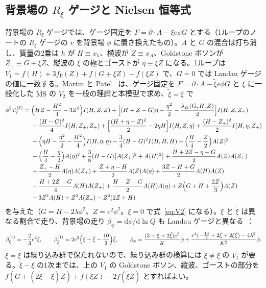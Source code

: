 \documentclass[a4paper,10pt]{ltjsarticle}
\newcommand{\dd}{\mathrm{d}}
\newcommand{\MSbar}{\overline{\mathrm{MS}}}
\begin{document}
\subsection{背景場の $R_\xi$ ゲージと Nielsen 恒等式}\label{sec:rxi}

背景場の $R_\xi$ ゲージでは、ゲージ固定を $F=\partial\!\cdot\!A-\xi e\phi G$ とする（1ループのノートの $R_\xi$ ゲージの $v$ を背景場 $\phi$ に置き換えたもの）。$A$ と $G$ の混合は打ち消し、質量の2乗は $h$ が $H\equiv x_h$、横波が $Z\equiv x_A$、Goldstone ボソンが $Z_+\equiv G+\xi Z$、縦波の $\xi$ の極とゴーストが $\eta\equiv\xi Z$ になる。1ループは $V_1=f(H)+3f_V(Z)+f(G+\xi Z)-f(\xi Z)$ で、$G=0$ では Landau ゲージの値に一致する。Martin と Patel~\cite{mp18} は、ゲージ固定を $F=\partial\!\cdot\!A-\tilde\xi e\phi G$ と $\xi$ に一般化した $\MSbar$ の $V_2$ を一般の理論と本模型で求め、$\tilde\xi=\xi$ で
\begin{equation}
\begin{aligned}
\phi^2V_2^{(\xi)}={}&\Bigl(HZ-\frac{H^2}4-3Z^2\Bigr)I(H,Z,Z)+\Bigl[(H+Z-G)\eta-\frac{\eta^2}2-\frac{\lambda_K(G,H,Z)}2\Bigr]I(H,Z,Z_+)\\
&-\frac{(H-G)^2}4I(H,Z_+,Z_+)+\Bigl[\frac{(H+\eta-Z)^2}2-2\eta H\Bigr]I(H,Z,\eta)+\frac{(H-Z_+)^2}2I(H,\eta,Z_+)\\
&+\Bigl(\eta H-\frac{\eta^2}2-\frac{H^2}4\Bigr)I(H,\eta,\eta)-\frac34(H-G)^2I(H,H,H)+\Bigl(\frac H4-\frac Z2\Bigr)A(Z)^2\\
&+\Bigl(\frac H4-\frac\eta2\Bigr)A(\eta)^2+\frac38(H-G)\bigl[A(Z_+)^2+A(H)^2\bigr]+\frac{H+2Z-\eta-G}2A(Z)A(Z_+)\\
&+\frac{Z_+-H}2A(\eta)A(Z_+)+\frac{Z+\eta-H}2A(Z)A(\eta)+\frac{3Z-H+G}2A(H)A(Z)\\
&+\frac{H+2Z-G}4A(H)A(Z_+)+\frac{H-Z-G}2A(H)A(\eta)+Z\Bigl(G+H+\frac{2Z}3\Bigr)A(Z)\\
&+3Z^2A(H)+Z^2A(Z_+)-Z^2(2Z+H)
\end{aligned}
\label{eq:V2rxi}
\end{equation}
を与えた（$G=H-2\lambda\phi^2$、$Z=e^2\phi^2$。$\xi=0$ で式~\eqref{eq:V2} になる）。$\xi$ と $\tilde\xi$ は異なる割合で走り、背景場の走り $\beta_\phi=\dd\phi/\dd\ln Q$ も Landau ゲージと異なる~\cite{mp18}：
\begin{equation*}
\beta_\xi^{(1)}=-\frac23e^2\xi,\qquad \beta_{\tilde\xi}^{(1)}=2e^2\Bigl(\xi-\tilde\xi-\frac{10}3\Bigr)\tilde\xi,\qquad
\beta_\phi=\frac{(3-\xi+2\tilde\xi)e^2}K\phi+\frac{e^4(-\frac{10}3+2\tilde\xi+2\xi\tilde\xi)-4\lambda^2}{K^2}\phi.
\end{equation*}$\tilde\xi=\xi$ は繰り込み群で保たれないので、繰り込み群の検算には $\tilde\xi\ne\xi$ の $V_1$ が要る。$\tilde\xi-\xi$ の1次までは、上の $V_1$ の Goldstone ボソン、縦波、ゴーストの部分を $f(G+(2\tilde\xi-\xi)Z)+f(\xi Z)-2f(\tilde\xi Z)$ とすればよい。
\end{document}
